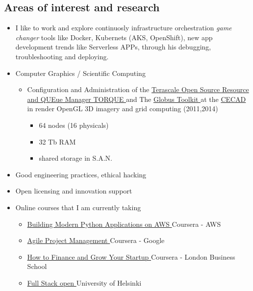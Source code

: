 \documentclass[overlapped,line,final]{res}
\begin{document}
\begin{resume}
\section{\sc Areas of interest and research}
\vspace{0.5cm}
\begin{itemize}
	\item I like to work and explore continuosly infrastructure orchestration \textit{game changer} tools like Docker, Kubernets (AKS, OpenShift), new app development trends like Serverless APPs, through his debugging, troubleshooting and deploying.
    \item Computer Graphics / Scientific Computing
	    \begin{itemize}
		\item Configuration and Administration of the \href {https://github.com/adaptivecomputing/torque#torque-resource-manager}{Terascale Open Source Resource and QUEue Manager TORQUE } and The \href{https://toolkit.globus.org/}{Globus Toolkit } at the \href{https://cecad.udistrital.edu.co/}{CECAD } in render OpenGL 3D imagery and grid computing (2011,2014)
	 \begin{itemize}
	  \item 64 nodes (16 physicals)
	  \item 32 Tb RAM
	  \item shared storage in S.A.N.
	 \end{itemize}
	\end{itemize}
    	\item Good engineering practices, ethical hacking
	\item Open licensing and innovation support
	\item Online courses that I am currently taking
		\begin{itemize}
			\item \href{https://www.coursera.org/learn/building-modern-python-applications-on-aws}{Building Modern Python Applications on AWS } Coursera - AWS
			\item \href{https://www.coursera.org/learn/agile-project-management}{Agile Project Management } Coursera - Google
			\item \href{https://www.coursera.org/learn/startup-financing-without-vc/}{How to Finance and Grow Your Startup } Coursera - London Business School
			\item \href{https://fullstackopen.com/en/}{Full Stack open } University of Helsinki

\end{itemize}
\end{itemize}
\end{resume}
\end{document}
